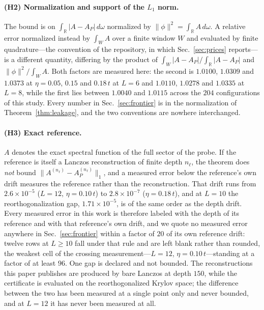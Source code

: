 \paragraph{(H2) Normalization and support of the $L_1$ norm.} The bound is on
$\int_{\mathbb R}\lvert A-A_P\rvert\,d\omega$ normalized by
$\lVert\phi\rVert^{2}=\int_{\mathbb R}A\,d\omega$. A relative error normalized instead by $\int_W A$
over a finite window $W$ and evaluated by finite quadrature---the convention of the repository, in
which Sec.~\ref{sec:prices} reports---is a different quantity, differing by the product of
$\int_W\lvert A-A_P\rvert/\int_{\mathbb R}\lvert A-A_P\rvert$ and $\lVert\phi\rVert^{2}/\int_W A$.
Both factors are measured here: the second is $1.0100$, $1.0309$ and $1.0373$ at $\eta=0.05$, $0.15$
and $0.18\,t$ at $L=6$ and $1.0110$, $1.0278$ and $1.0335$ at $L=8$, while the first lies between
$1.0040$ and $1.0115$ across the $204$ configurations of this study. Every number in
Sec.~\ref{sec:frontier} is in the normalization of Theorem~\ref{thm:leakage}, and the two conventions
are nowhere interchanged.

\paragraph{(H3) Exact reference.} $A$ denotes the exact spectral function of the full sector of the
probe. If the reference is itself a Lanczos reconstruction of finite depth $n_\ell$, the theorem does
\emph{not} bound $\lVert A^{(n_\ell)}-A_P^{(n_\ell)}\rVert_1$, and a measured error below the
reference's own drift measures the reference rather than the reconstruction. That drift runs from
$2.6\times10^{-5}$ ($L=12$, $\eta=0.10\,t$) to $2.8\times10^{-7}$ ($\eta=0.18\,t$), and at $L=10$ the
reorthogonalization gap, $1.71\times10^{-5}$, is of the same order as the depth drift. Every measured error in this work is therefore labeled with the depth of its reference and with
that reference's own drift, and we
quote no measured error anywhere in Sec.~\ref{sec:frontier} within a factor of $20$ of its own
reference drift: twelve rows at $L\ge10$ fall under that rule and are left blank rather than rounded,
the weakest cell of the crossing measurement---$L=12$, $\eta=0.10\,t$---standing at a factor of at least $96$. One gap is declared
and not bounded. The reconstructions this paper publishes are produced by bare Lanczos at depth $150$,
while the certificate is evaluated on the reorthogonalized Krylov space; the difference between the
two has been measured at a single point only and never bounded, and at $L=12$ it has never been measured at all.

